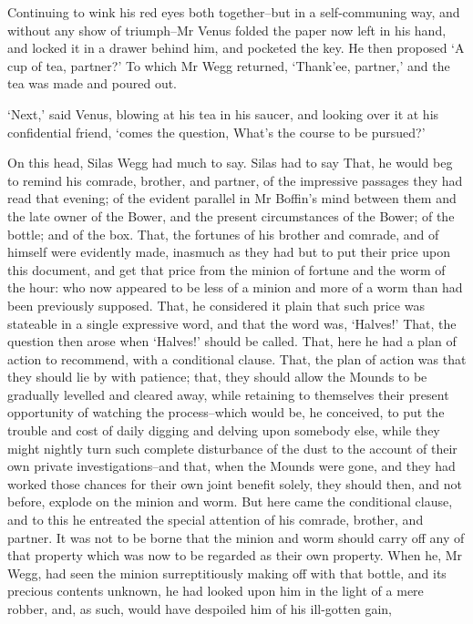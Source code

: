 Continuing to wink his red eyes both together--but in a self-communing
way, and without any show of triumph--Mr Venus folded the paper now left
in his hand, and locked it in a drawer behind him, and pocketed the key.
He then proposed ‘A cup of tea, partner?’ To which Mr Wegg returned,
‘Thank’ee, partner,’ and the tea was made and poured out.

‘Next,’ said Venus, blowing at his tea in his saucer, and looking over
it at his confidential friend, ‘comes the question, What’s the course to
be pursued?’

On this head, Silas Wegg had much to say. Silas had to say That, he
would beg to remind his comrade, brother, and partner, of the impressive
passages they had read that evening; of the evident parallel in Mr
Boffin’s mind between them and the late owner of the Bower, and the
present circumstances of the Bower; of the bottle; and of the box. That,
the fortunes of his brother and comrade, and of himself were evidently
made, inasmuch as they had but to put their price upon this document,
and get that price from the minion of fortune and the worm of the hour:
who now appeared to be less of a minion and more of a worm than had been
previously supposed. That, he considered it plain that such price was
stateable in a single expressive word, and that the word was, ‘Halves!’
That, the question then arose when ‘Halves!’ should be called. That,
here he had a plan of action to recommend, with a conditional clause.
That, the plan of action was that they should lie by with patience;
that, they should allow the Mounds to be gradually levelled and cleared
away, while retaining to themselves their present opportunity of
watching the process--which would be, he conceived, to put the trouble
and cost of daily digging and delving upon somebody else, while they
might nightly turn such complete disturbance of the dust to the account
of their own private investigations--and that, when the Mounds were
gone, and they had worked those chances for their own joint benefit
solely, they should then, and not before, explode on the minion and
worm. But here came the conditional clause, and to this he entreated the
special attention of his comrade, brother, and partner. It was not to
be borne that the minion and worm should carry off any of that property
which was now to be regarded as their own property. When he, Mr Wegg,
had seen the minion surreptitiously making off with that bottle, and its
precious contents unknown, he had looked upon him in the light of a mere
robber, and, as such, would have despoiled him of his ill-gotten gain,
